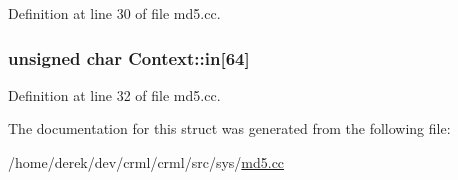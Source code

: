 Definition at line 30 of file md5.cc.

\hypertarget{struct_context_aa61c772c852c42003af44ec1c6bb56dc}{
\subsubsection[{in}]{\setlength{\rightskip}{0pt plus 5cm}unsigned char {\bf Context::in}\mbox{[}64\mbox{]}}}
\label{struct_context_aa61c772c852c42003af44ec1c6bb56dc}


Definition at line 32 of file md5.cc.



The documentation for this struct was generated from the following file:\begin{DoxyCompactItemize}
\item 
/home/derek/dev/crml/crml/src/sys/\hyperlink{md5_8cc}{md5.cc}\end{DoxyCompactItemize}
